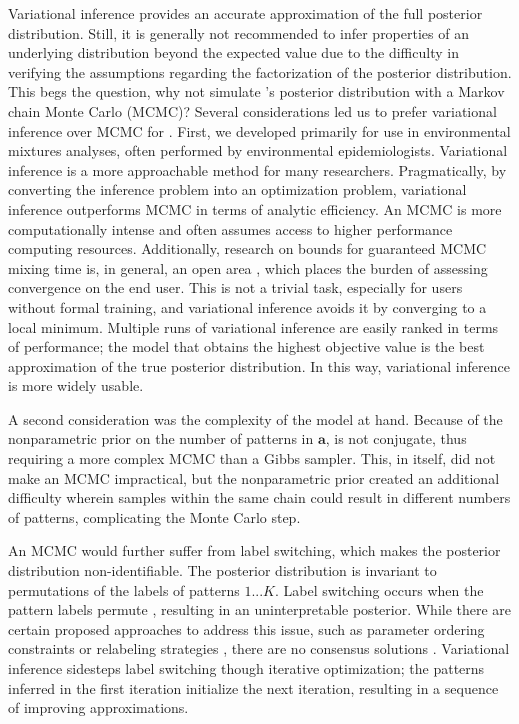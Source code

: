 Variational inference provides an accurate approximation of the full posterior distribution. Still, it is generally not recommended to infer properties of an underlying distribution beyond the expected value due to the difficulty in verifying the assumptions regarding the factorization of the posterior distribution. This begs the question, why not simulate \bnmfc's posterior distribution with a Markov chain Monte Carlo (MCMC)? Several considerations led us to prefer variational inference over MCMC for \bnmfc. First, we developed \bnmf primarily for use in environmental mixtures analyses, often performed by environmental epidemiologists. Variational inference is a more approachable method for many researchers. Pragmatically, by converting the inference problem into an optimization problem, variational inference outperforms MCMC in terms of analytic efficiency. An MCMC is more computationally intense and often assumes access to higher performance computing resources. Additionally, research on bounds for guaranteed MCMC mixing time is, in general, an open area \cite{levin2017markov}, which places the burden of assessing convergence on the end user. This is not a trivial task, especially for users without formal training, and variational inference avoids it by converging to a local minimum. Multiple runs of variational inference are easily ranked in terms of performance; the model that obtains the highest objective value is the best approximation of the true posterior distribution. In this way, variational inference is more widely usable. 

A second consideration was the complexity of the model at hand. Because of the nonparametric prior on the number of patterns in $\mathbf{a}$, \bnmf is not conjugate, thus requiring a more complex MCMC than a Gibbs sampler. This, in itself, did not make an MCMC impractical, but the nonparametric prior created an additional difficulty wherein samples within the same chain could result in different numbers of patterns, complicating the Monte Carlo step.

An MCMC would further suffer from label switching, which makes the posterior distribution non-identifiable. The posterior distribution is invariant to permutations of the labels of patterns $1 ... K$. Label switching occurs when the pattern labels permute \cite{celeux1998bayesian}, resulting in an uninterpretable posterior. While there are certain proposed approaches to address this issue, such as parameter ordering constraints or relabeling strategies \cite{rodriguez2014label}, there are no consensus solutions \cite{gelman06}. Variational inference sidesteps label switching though iterative optimization; the patterns inferred in the first iteration initialize the next iteration, resulting in a sequence of improving approximations.


